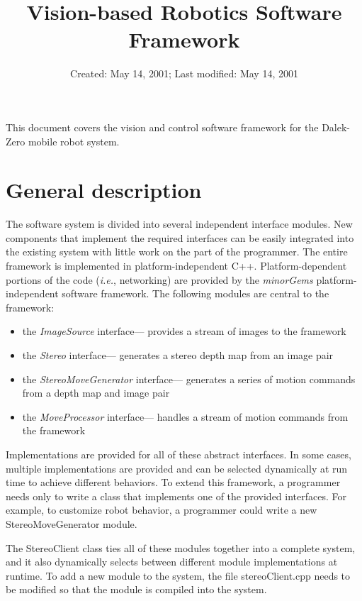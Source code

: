 \documentclass[12pt]{article}
\begin{document}
\title{Vision-based Robotics Software Framework}
\date{Created: May 14, 2001;  Last modified: May 14, 2001}

\maketitle

This document covers the vision and control software framework for the Dalek-Zero mobile robot system.

\section{General description}
The software system is divided into several independent interface modules.  New components that implement the required interfaces can be easily integrated into the existing system with little work on the part of the programmer.  The entire framework is implemented in platform-independent C++.  Platform-dependent portions of the code ({\it i.e.}, networking) are provided by the {\it minorGems} platform-independent software framework.  The following modules are central to the framework:
\begin{itemize}
\item the {\it ImageSource} interface--- provides a stream of images to the framework
\item the {\it Stereo} interface--- generates a stereo depth map from an image pair
\item the {\it StereoMoveGenerator} interface--- generates a series of motion commands from a depth map and image pair
\item the {\it MoveProcessor} interface--- handles a stream of motion commands from the framework
\end{itemize}
Implementations are provided for all of these abstract interfaces.  In some cases, multiple implementations are provided and can be selected dynamically at run time to achieve different behaviors.  To extend this framework, a programmer needs only to write a class that implements one of the provided interfaces.  For example, to customize robot behavior, a programmer could write a new StereoMoveGenerator  module.

The StereoClient class ties all of these modules together into a complete system, and it also dynamically selects between different module implementations at runtime.  To add a new module to the system, the file stereoClient.cpp needs to be modified so that the module is compiled into the system.
\end{document}
